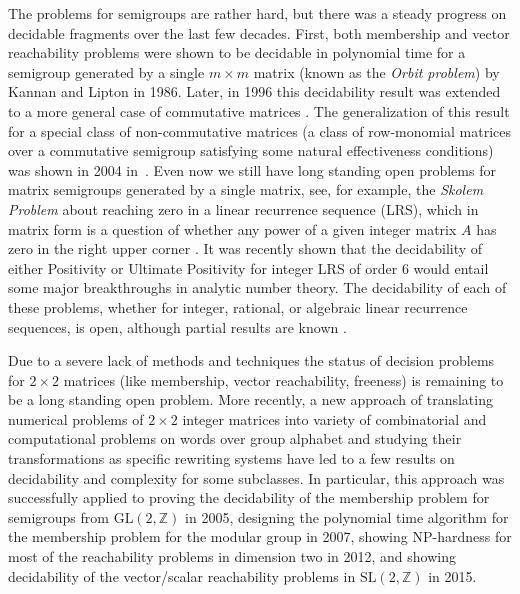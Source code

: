 \documentclass[fontsize=11pt,DIV=13,paper=letter]{scrartcl}
\theoremstyle{definition}
\newcommand{\Z}{\mathbb{Z}}
\newcommand{\SL}{\mathrm{SL}(2,\Z)}
\newcommand{\GL}{\mathrm{GL}(2,\Z)}
\begin{document}
The problems for semigroups are rather hard, but there was a steady progress on decidable fragments over the last few decades.
First, both membership and vector reachability problems were shown to be decidable in polynomial time
for a semigroup generated by a single  $m \times m$ matrix (known as the {\sl Orbit problem}) by Kannan and Lipton \cite{KL86} in 1986.
Later, in 1996 this decidability result was extended to a more general case of  
commutative matrices \cite{Babai}.
The generalization of this result for a special class of non-commutative matrices
(a class of row-monomial matrices over a commutative semigroup satisfying some natural effectiveness conditions)
was shown in 2004 in~\cite{LP2004}.
Even now we still have long standing open problems for matrix semigroups generated by a single matrix,
see, for example, the {\sl Skolem Problem} about reaching zero in a linear recurrence sequence (LRS), which in matrix 
form is a question of whether any power of a given integer matrix $A$ has zero in the right upper corner \cite{STOC2013,COW_JACM}. It was recently shown
that the decidability of either Positivity or Ultimate Positivity
for integer LRS of order 6 would entail some major breakthroughs
in analytic number theory. The decidability of each of
these problems, whether for integer, rational, or algebraic
linear recurrence sequences, is open, although partial results
are known \cite{GOW_STACS2015,OSW2015,OW_ICALP2015-1,OW_ICALP2015-2}.

Due to a severe lack of methods and techniques the status of decision problems for $2 \times 2$ matrices (like membership, vector reachability, freeness) is remaining to be a long standing open problem. More recently, a new approach of translating numerical problems of $2 \times 2$ integer matrices into variety of combinatorial and computational problems on words over group alphabet and studying their transformations as specific rewriting systems have  led to a few results on decidability and complexity for some subclasses. 
In particular, this approach was successfully applied to proving the decidability of the membership problem for semigroups from $\GL$ \cite{CK2005} in 2005,  designing the polynomial time algorithm for the membership problem for the modular group \cite{Gurevich2007} in 2007,  showing NP-hardness for most of the reachability problems in dimension two \cite{BP2012,BHP2012} in 2012,
and showing decidability of the vector/scalar reachability problems in $\SL$ \cite{PS15} in 2015.
\end{document}
